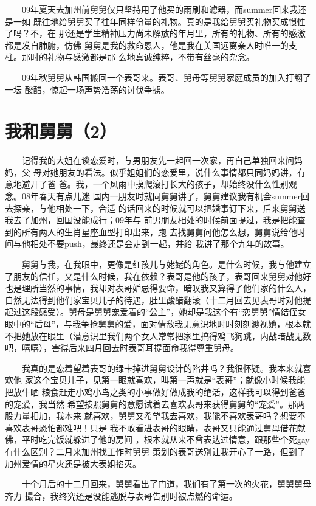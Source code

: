 \documentclass[12pt]{book}
\begin{document}
　　09年夏天去加州前舅舅仅只坚持用了他买的雨刷和滤器，而summer回来我还是一如
既往地给舅舅买了往年同样份量的礼物。真的是我给舅舅买礼物买成惯性了吗？不，在
那还是学生精神压力尚未解放的年月里，所有的礼物、所有的感激都是发自肺腑，仿佛
舅舅是我的救命恩人，他是我在美国远离亲人时唯一的支柱。那时的礼物与感激都是那
么地真诚纯粹，不带有丝毫的杂念。

　　09年秋舅舅从韩国搬回一个表哥来。表哥、舅母等舅舅家庭成员的加入打翻了一坛
酸醋，惊起一场声势浩荡的讨伐争掳。
\section{我和舅舅（2）}
\label{sec-8-28}

　　记得我的大姐在谈恋爱时，与男朋友先一起回一次家，再自己单独回来问妈妈，父
母对她朋友的看法。似乎姐姐们的恋爱里，说什么事情都只同妈妈讲，有意地避开了爸
爸。我，一个风雨中摸爬滚打长大的孩子，却始终没什么性别观念。08年春天有点儿迷
国内一朋友时就同舅舅讲了，舅舅建议我有机会summer回去探亲，与他相处一下，合适
的话回来的时候就可以把婚事订下来，后来舅舅送我去了加州，回国没能成行；09年与
前男朋友相处的时候前面提过，我是把能查到的所有两人的生肖星座血型打印出来，跑
去找舅舅问他怎么想，舅舅说给他时间与他相处不要push，最终还是会走到一起，并给
我讲了那个九年的故事。

　　舅舅与我，在我眼中，更像是红孩儿与姥姥的角色。是什么时候，我与他建立了朋友的信任，又是什么时候，我在依赖？表哥是他的孩子，表哥回来舅舅对他好也是理所当然的事情，我却对表哥妒忌得要命，暗叹我又算得了他们家的什么人，自然无法得到他们家宝贝儿子的待遇，肚里酸醋翻滚（十二月回去见表哥时对他提起过这段感受）。舅母是舅舅宠爱着的“公主”，她却是我这个有“恋舅舅”情结侄女眼中的“后母”，与我争抢舅舅的爱，面对情敌我无意识地时时刻刻渺视她，根本就不把她放在眼里（潜意识里我们两个女人常常把家里搞得鸡飞狗跳，内战暗战无数吧，嘻嘻），害得后来四月回去时表哥耳提面命我得尊重舅母。

　　我真的是恋着望着表哥的绿卡掉进舅舅设计的陷井吗？我很怀疑。我本来就喜欢他
家这个宝贝儿子，见第一眼就喜欢，叫第一声就是“表哥”；就像小时候我能把放牛晒
粮食赶走小鸡小鸟之类的小事做好做成我的绝活，这样我可以得到爸爸的宠爱，我当然
希望按照舅舅的意愿试着去喜欢表哥来获得舅舅的“宠爱”。那两股力量相加，我本来
就喜欢，舅舅又希望我去喜欢，我能不喜欢表哥吗？想要不喜欢表哥恐怕都难吧！只是
我不敢看进表哥的眼睛，表哥又只能通过舅母借花献佛，平时吃完饭就躲进了他的房间
，根本就从来不曾表达过情意，跟那些个死gay有什么区别？二月来加州找工作时舅舅
策划的表哥送别让我开心了一路，但到了加州爱情的星火还是被大表姐掐灭。

　　十个月后的十二月回来，舅舅看出了门道，我们有了第一次的火花，舅舅舅母齐力
撮合，我终究还是没能逃脱与表哥告别时被点燃的命运。
\end{document}
